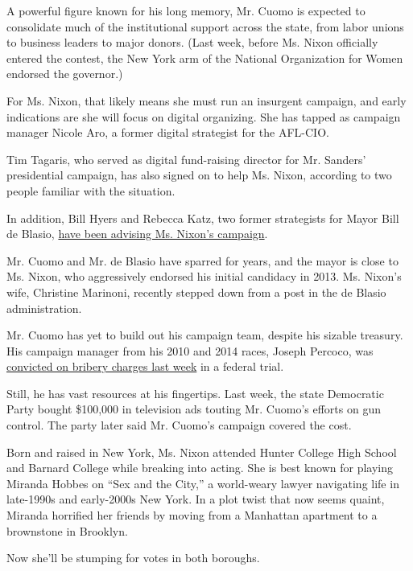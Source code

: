 A powerful figure known for his long memory, Mr. Cuomo is expected to
consolidate much of the institutional support across the state, from
labor unions to business leaders to major donors. (Last week, before Ms.
Nixon officially entered the contest, the New York arm of the National
Organization for Women endorsed the governor.)

For Ms. Nixon, that likely means she must run an insurgent campaign, and
early indications are she will focus on digital organizing. She has
tapped as campaign manager Nicole Aro, a former digital strategist for
the AFL-CIO.

Tim Tagaris, who served as digital fund-raising director for Mr.
Sanders' presidential campaign, has also signed on to help Ms. Nixon,
according to two people familiar with the situation.

In addition, Bill Hyers and Rebecca Katz, two former strategists for
Mayor Bill de Blasio,
\href{https://www.nytimes3xbfgragh.onion/2018/03/06/nyregion/cynthia-nixon-cuomo-governor-ny.html}{have
been advising Ms. Nixon's campaign}.

Mr. Cuomo and Mr. de Blasio have sparred for years, and the mayor is
close to Ms. Nixon, who aggressively endorsed his initial candidacy in
2013. Ms. Nixon's wife, Christine Marinoni, recently stepped down from a
post in the de Blasio administration.

Mr. Cuomo has yet to build out his campaign team, despite his sizable
treasury. His campaign manager from his 2010 and 2014 races, Joseph
Percoco, was
\href{https://www.nytimes3xbfgragh.onion/2018/03/13/nyregion/percoco-corruption-bribery-trial-cuomo-guilty.html}{convicted
on bribery charges last week} in a federal trial.

Still, he has vast resources at his fingertips. Last week, the state
Democratic Party bought \$100,000 in television ads touting Mr. Cuomo's
efforts on gun control. The party later said Mr. Cuomo's campaign
covered the cost.

Born and raised in New York, Ms. Nixon attended Hunter College High
School and Barnard College while breaking into acting. She is best known
for playing Miranda Hobbes on ``Sex and the City,'' a world-weary lawyer
navigating life in late-1990s and early-2000s New York. In a plot twist
that now seems quaint, Miranda horrified her friends by moving from a
Manhattan apartment to a brownstone in Brooklyn.

Now she'll be stumping for votes in both boroughs.

